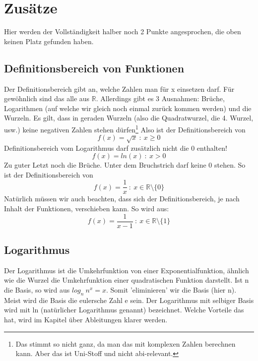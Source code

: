 \section{Zusätze}
Hier werden der Vollständigkeit halber noch 2 Punkte angesprochen, die oben keinen Platz gefunden haben.
\subsection{Definitionsbereich von Funktionen}
Der Definitionsbereich gibt an, welche Zahlen man für x einsetzen darf. Für gewöhnlich sind das alle aus \(\mathbb{R}\). Allerdings gibt es 3 Ausnahmen: Brüche, Logarithmen (auf welche wir gleich noch einmal zurück kommen werden) und die Wurzeln. Es gilt, dass in geraden Wurzeln (also die Quadratwurzel, die 4. Wurzel, usw.) keine negativen Zahlen stehen dürfen\footnote{Das stimmt so nicht ganz, da man das mit komplexen Zahlen berechnen kann. Aber das ist Uni-Stoff und nicht abi-relevant.} Also ist der Definitionsbereich von
\[f(x)=\sqrt{x}\ :\ x\geq 0\]
Definitionsbereich vom Logarithmus darf zusätzlich nicht die 0 enthalten!
\[f(x)=ln(x)\ :\ x>0\]
Zu guter Letzt noch die Brüche. Unter dem Bruchstrich darf keine 0 stehen. So ist der Definitionsbereich von
\[f(x)=\frac{1}{x}\ :\ x\in\mathbb{R}\setminus\{0\}\]
Natürlich müssen wir auch beachten, dass sich der Definitionsbereich, je nach Inhalt der Funktionen, verschieben kann. So wird aus:
\[f(x)=\frac{1}{x-1}\ :\ x\in\mathbb{R}\setminus\{1\}\]
\subsection{Logarithmus}
Der Logarithmus ist die Umkehrfunktion von einer Exponentialfunktion, ähnlich wie die Wurzel die Umkehrfunktion einer quadratischen Funktion darstellt. Ist n die Basis, so wird aus \(log_n\ n^x=x\). Somit 'eliminieren' wir die Basis (hier n). Meist wird die Basis die eulersche Zahl e sein. Der Logarithmus mit selbiger Basis wird mit ln (natürlicher Logarithmus genannt) bezeichnet. Welche Vorteile das hat, wird im Kapitel über Ableitungen klarer werden.
